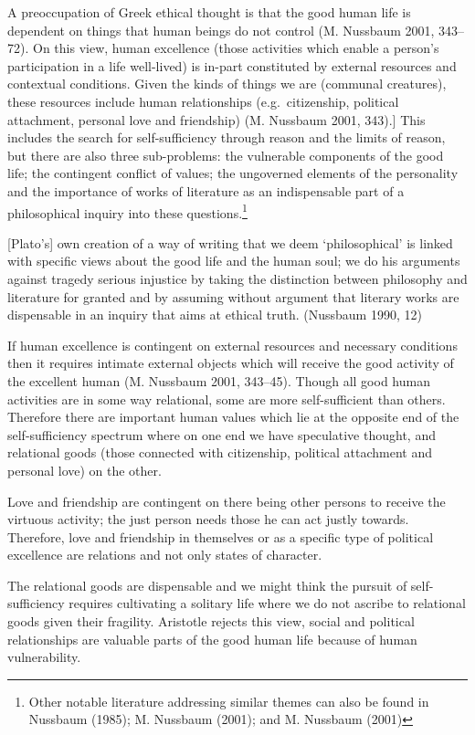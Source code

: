 \documentclass[
  letterpaper,
  DIV=11,
  numbers=noendperiod]{scrartcl}
\theoremstyle{remark}
\begin{document}
A preoccupation of Greek ethical thought is that the good human life is
dependent on things that human beings do not control (M. Nussbaum 2001,
343--72). On this view, human excellence (those activities which enable
a person's participation in a life well-lived) is in-part constituted by
external resources and contextual conditions. Given the kinds of things
we are (communal creatures), these resources include human relationships
(e.g.~citizenship, political attachment, personal love and friendship)
(M. Nussbaum 2001, 343).{]} This includes the search for
self-sufficiency through reason and the limits of reason, but there are
also three sub-problems: the vulnerable components of the good life; the
contingent conflict of values; the ungoverned elements of the
personality and the importance of works of literature as an
indispensable part of a philosophical inquiry into these
questions.\footnote{Other notable literature addressing similar themes
  can also be found in Nussbaum (1985); M. Nussbaum (2001); and M.
  Nussbaum (2001)}

{[}Plato's{]} own creation of a way of writing that we deem
`philosophical' is linked with specific views about the good life and
the human soul; we do his arguments against tragedy serious injustice by
taking the distinction between philosophy and literature for granted and
by assuming without argument that literary works are dispensable in an
inquiry that aims at ethical truth. (Nussbaum 1990, 12)

If human excellence is contingent on external resources and necessary
conditions then it requires intimate external objects which will receive
the good activity of the excellent human (M. Nussbaum 2001, 343--45).
Though all good human activities are in some way relational, some are
more self-sufficient than others. Therefore there are important human
values which lie at the opposite end of the self-sufficiency spectrum
where on one end we have speculative thought, and relational goods
(those connected with citizenship, political attachment and personal
love) on the other.

Love and friendship are contingent on there being other persons to
receive the virtuous activity; the just person needs those he can act
justly towards. Therefore, love and friendship in themselves or as a
specific type of political excellence are relations and not only states
of character.

The relational goods are dispensable and we might think the pursuit of
self-sufficiency requires cultivating a solitary life where we do not
ascribe to relational goods given their fragility. Aristotle rejects
this view, social and political relationships are valuable parts of the
good human life because of human vulnerability.
\end{document}
